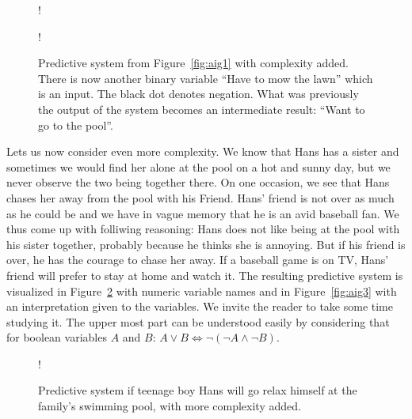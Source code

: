 \begin{figure}[!htb]
    \centering
  \begin{minipage}[b]{.3\linewidth}
    \centering
    \resizebox {0.875\textwidth} {!} {
      
    }
    \label{fig:aig2-num}
  \end{minipage}
  \begin{minipage}[b]{.6\linewidth}
    \centering
    \resizebox {0.8\textwidth} {!} {
      
    }
    \label{fig:aig2-text}
  \end{minipage}
\caption{Predictive system from Figure~\ref{fig:aig1} with complexity added. There is now another binary variable \enquote{Have to mow the lawn} which is an input. The black dot denotes negation. What was previously the output of the system becomes an intermediate result: \enquote{Want to go to the pool}.}
\label{fig:aig2}
\end{figure}
\FloatBarrier

\noindent Lets us now consider even more complexity. We know that Hans has a sister and sometimes we would find her alone at the pool on a hot and sunny day, but we never observe the two being together there. On one occasion, we see that Hans chases her away from the pool with his Friend. Hans' friend is not over as much as he could be and we have in vague memory that he is an avid baseball fan. We thus come up with folliwing reasoning: Hans does not like being at the pool with his sister together, probably because he thinks she is annoying. But if his friend is over, he has the courage to chase her away. If a baseball game is on TV, Hans' friend will prefer to stay at home and watch it. The resulting predictive system is visualized in Figure~\ref{fig:aig3-num} with numeric variable names and in Figure~\ref{fig:aig3} with an interpretation given to the variables. We invite the reader to take some time studying it. The upper most part can be understood easily by considering that for boolean variables $A$ and $B$: $A \vee B \Leftrightarrow \lnot (\lnot A \wedge \lnot B)$.

\begin{figure}[!htb]
    \centering
    \resizebox {0.35\textwidth} {!} {
      
    }
    \caption{Predictive system if teenage boy Hans will go relax himself at the family's swimming pool, with more complexity added.}
\label{fig:aig3-num}
\end{figure}
\FloatBarrier


